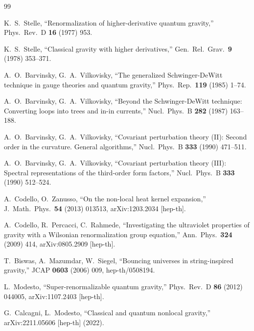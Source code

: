 \documentclass[12pt,a4paper]{article}
\theoremstyle{definition}
\theoremstyle{remark}
\begin{document}
\begin{thebibliography}{99}

  K.~S.~Stelle,
  ``Renormalization of higher-derivative quantum gravity,''
  Phys.\ Rev.\ D \textbf{16} (1977) 953.

  K.~S.~Stelle,
  ``Classical gravity with higher derivatives,''
  Gen.\ Rel.\ Grav.\ \textbf{9} (1978) 353--371.

  A.~O.~Barvinsky, G.~A.~Vilkovisky,
  ``The generalized Schwinger-DeWitt technique in gauge theories and
  quantum gravity,''
  Phys.\ Rep.\ \textbf{119} (1985) 1--74.

  A.~O.~Barvinsky, G.~A.~Vilkovisky,
  ``Beyond the Schwinger-DeWitt technique: Converting loops into
  trees and in-in currents,''
  Nucl.\ Phys.\ B \textbf{282} (1987) 163--188.

  A.~O.~Barvinsky, G.~A.~Vilkovisky,
  ``Covariant perturbation theory (II): Second order in the
  curvature. General algorithms,''
  Nucl.\ Phys.\ B \textbf{333} (1990) 471--511.

  A.~O.~Barvinsky, G.~A.~Vilkovisky,
  ``Covariant perturbation theory (III): Spectral representations
  of the third-order form factors,''
  Nucl.\ Phys.\ B \textbf{333} (1990) 512--524.

  A.~Codello, O.~Zanusso,
  ``On the non-local heat kernel expansion,''
  J.\ Math.\ Phys.\ \textbf{54} (2013) 013513,
  arXiv:1203.2034 [hep-th].

  A.~Codello, R.~Percacci, C.~Rahmede,
  ``Investigating the ultraviolet properties of gravity with a
  Wilsonian renormalization group equation,''
  Ann.\ Phys.\ \textbf{324} (2009) 414,
  arXiv:0805.2909 [hep-th].

  T.~Biswas, A.~Mazumdar, W.~Siegel,
  ``Bouncing universes in string-inspired gravity,''
  JCAP \textbf{0603} (2006) 009,
  hep-th/0508194.

  L.~Modesto,
  ``Super-renormalizable quantum gravity,''
  Phys.\ Rev.\ D \textbf{86} (2012) 044005,
  arXiv:1107.2403 [hep-th].

  G.~Calcagni, L.~Modesto,
  ``Classical and quantum nonlocal gravity,''
  arXiv:2211.05606 [hep-th] (2022).


\end{thebibliography}
\end{document}
